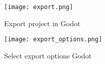 \documentclass{sigplanconf}
\begin{document}
\begin{figure}[h]
  \caption{Export project in Godot}
  \texttt{[image: export.png]}
\end{figure}

\begin{figure}[h]
  \caption{Select export options Godot}
  \texttt{[image: export\_options.png]}
\end{figure}

\end{document}
